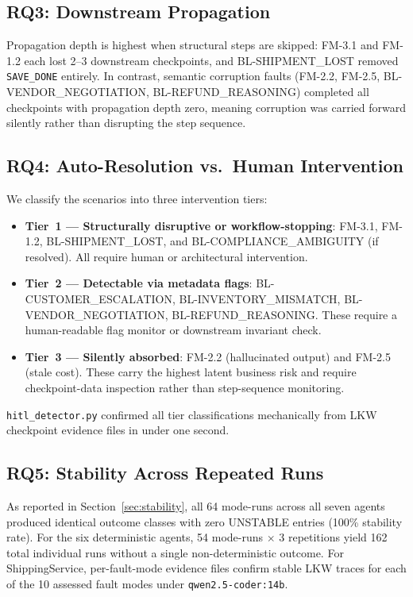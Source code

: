 \documentclass[conference]{IEEEtran}
\begin{document}
\subsection{RQ3: Downstream Propagation}
Propagation depth is highest when structural steps are skipped: FM-3.1 and
FM-1.2 each lost 2--3 downstream checkpoints, and BL-SHIPMENT\_LOST removed
\texttt{SAVE\_DONE} entirely. In contrast, semantic corruption faults (FM-2.2,
FM-2.5, BL-VENDOR\_NEGOTIATION, BL-REFUND\_REASONING) completed all checkpoints
with propagation depth zero, meaning corruption was carried forward silently
rather than disrupting the step sequence.

\subsection{RQ4: Auto-Resolution vs.\ Human Intervention}
\label{sec:rq4}

We classify the scenarios into three intervention tiers:

\begin{itemize}
  \item \textbf{Tier~1 --- Structurally disruptive or workflow-stopping}:
        FM-3.1, FM-1.2, BL-SHIPMENT\_LOST, and BL-COMPLIANCE\_AMBIGUITY (if
        resolved). All require human or architectural intervention.

  \item \textbf{Tier~2 --- Detectable via metadata flags}:
        BL-CUSTOMER\_ESCALATION, BL-INVENTORY\_MISMATCH, BL-VENDOR\_NEGOTIATION,
        BL-REFUND\_REASONING. These require a human-readable flag monitor or
        downstream invariant check.

  \item \textbf{Tier~3 --- Silently absorbed}: FM-2.2 (hallucinated output)
        and FM-2.5 (stale cost). These carry the highest latent business risk
        and require checkpoint-data inspection rather than step-sequence
        monitoring.
\end{itemize}

\texttt{hitl\_detector.py} confirmed all tier classifications mechanically from
LKW checkpoint evidence files in under one second.

\subsection{RQ5: Stability Across Repeated Runs}
As reported in Section~\ref{sec:stability}, all 64 mode-runs across all seven
agents produced identical outcome classes with zero UNSTABLE entries (100\%
stability rate). For the six deterministic agents, 54 mode-runs $\times$ 3
repetitions yield 162 total individual runs without a single non-deterministic
outcome. For ShippingService, per-fault-mode evidence files confirm stable LKW
traces for each of the 10 assessed fault modes under
\texttt{qwen2.5-coder:14b}.
\end{document}
